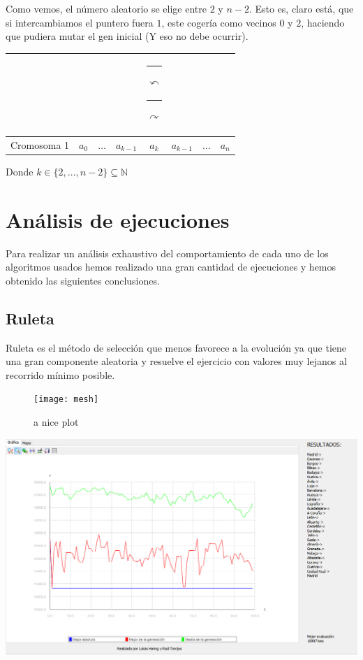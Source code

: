 \documentclass{article}
\def\MCr{
	\multicolumn{1}{c}{
		\rule{-5pt}{0ex}$\stackrel{}{\curvearrowleft}$
		\rule{+20pt}{0ex}$\stackrel{}{\curvearrowright}$
	}
}
\def\MCe{\multicolumn{1}{c}{}}
\begin{document}
Como vemos, el número aleatorio se elige entre $2$ y $n-2$. Esto es, claro está, que si intercambiamos el puntero fuera $1$, este cogería como vecinos $0$ y $2$, haciendo que pudiera mutar el gen inicial (Y eso no debe ocurrir).


\begin{tabular}{|l|*7{c|}}
	\MCe & \MCe & \MCe & \MCe & \MCr & \MCe & \MCe \\\hline
	Cromosoma 1 & $a_0$ & $\dots$ & $a_{k-1}$ & $a_{k}$ & $a_{k-1}$ & $\dots$ & $a_{n}$ \\\hline
\end{tabular}
\newline\newline
Donde $k\in \{2, \dots, n-2\}\subseteq\mathbb{N}$



\section{Análisis de ejecuciones}
Para realizar un análisis exhaustivo del comportamiento de cada uno de los algoritmos usados hemos realizado una gran cantidad de ejecuciones y hemos obtenido las siguientes conclusiones.
\subsection{Ruleta}

Ruleta es el método de selección que menos favorece a la evolución ya que tiene una gran componente aleatoria y resuelve el ejercicio con valores muy lejanos al recorrido mínimo posible.
\\

\begin{figure}[h]
	\centering
	\texttt{[image: mesh]}
	\caption{a nice plot}
	\label{fig:mesh1}
\end{figure}

\includegraphics[scale=0.4]{./images/rule1.png}\par
\end{document}

